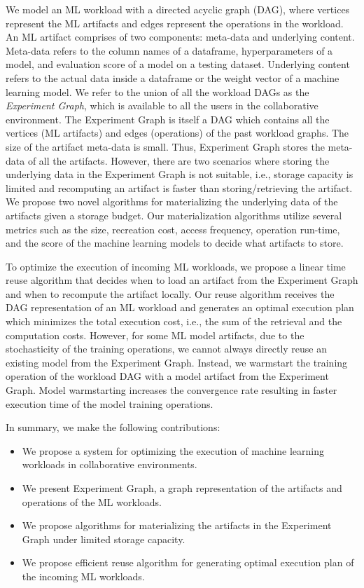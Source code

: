We model an ML workload with a directed acyclic graph (DAG), where vertices represent the ML artifacts and edges represent the operations in the workload.
An ML artifact comprises of two components: meta-data and underlying content.
Meta-data refers to the column names of a dataframe, hyperparameters of a model, and evaluation score of a model on a testing dataset.
Underlying content refers to the actual data inside a dataframe or the weight vector of a machine learning model.
We refer to the union of all the workload DAGs as the \textit{Experiment Graph}, which is available to all the users in the collaborative environment.
The Experiment Graph is itself a DAG which contains all the vertices (ML artifacts) and edges (operations) of the past workload graphs.
The size of the artifact meta-data is small.
Thus, Experiment Graph stores the meta-data of all the artifacts.
However, there are two scenarios where storing the underlying data in the Experiment Graph is not suitable, i.e., storage capacity is limited and recomputing an artifact is faster than storing/retrieving the artifact.
We propose two novel algorithms for materializing the underlying data of the artifacts given a storage budget.
Our materialization algorithms utilize several metrics such as the size, recreation cost, access frequency, operation run-time, and the score of the machine learning models to decide what artifacts to store.

To optimize the execution of incoming ML workloads, we propose a linear time reuse algorithm that decides when to load an artifact from the Experiment Graph and when to recompute the artifact locally.
Our reuse algorithm receives the DAG representation of an ML workload and generates an optimal execution plan which minimizes the total execution cost, i.e., the sum of the retrieval and the computation costs.
However, for some ML model artifacts, due to the stochasticity of the training operations, we cannot always directly reuse an existing model from the Experiment Graph.
Instead, we warmstart the training operation of the workload DAG with a model artifact from the Experiment Graph.
Model warmstarting increases the convergence rate resulting in faster execution time of the model training operations.

In summary, we make the following contributions:
\begin{itemize}
\item We propose a system for optimizing the execution of machine learning workloads in collaborative environments.
\item We present Experiment Graph, a graph representation of the artifacts and operations of the ML workloads.
\item We propose algorithms for materializing the artifacts in the Experiment Graph under limited storage capacity.
\item We propose efficient reuse algorithm for generating optimal execution plan of the incoming ML workloads.
\end{itemize}

